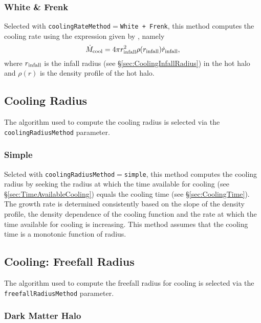 \subsubsection{White \& Frenk}

Selected with {\tt coolingRateMethod}$=${\tt White + Frenk}, this method computes the cooling rate using the expression given by \cite{white_galaxy_1991}, namely
\begin{equation}
\dot{M}_{\rm cool} = 4 \pi r_{\rm infall}^2 \rho(r_{\rm infall}) \dot{r}_{\rm infall},
\end{equation}
where $r_{\rm infall}$ is the infall radius (see \S\ref{sec:CoolingInfallRadius}) in the hot halo and $\rho(r)$ is the density profile of the hot halo.

\subsection{Cooling Radius}\label{sec:CoolingRadius}

The algorithm used to compute the cooling radius is selected via the {\tt coolingRadiusMethod} parameter.

\subsubsection{Simple}

Selcted with {\tt coolingRadiusMethod}$=${\tt simple}, this method computes the cooling radius by seeking the radius at which the time available for cooling (see \S\ref{sec:TimeAvailableCooling}) equals the cooling time (see \S\ref{sec:CoolingTime}). The growth rate is determined consistently based on the slope of the density profile, the density dependence of the cooling function and the rate at which the time available for cooling is increasing. This method assumes that the cooling time is a monotonic function of radius.

\subsection{Cooling: Freefall Radius}\label{sec:CoolingFreefallRadius}

The algorithm used to compute the freefall radius for cooling is selected via the {\tt freefallRadiusMethod} parameter.

\subsubsection{Dark Matter Halo}

